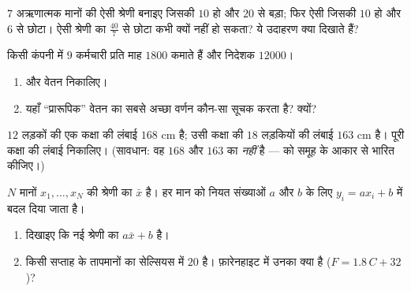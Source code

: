 \begin{exercise}[$\star\star$]\label{exo:g10:stats:6}
$7$ अऋणात्मक मानों की ऐसी श्रेणी बनाइए जिसकी  $10$ हो और 
$20$ से बड़ा; फिर ऐसी जिसकी  $10$ हो और  $6$ से छोटा। ऐसी
श्रेणी का  $\frac{40}{7}$ से छोटा कभी क्यों नहीं हो सकता? ये उदाहरण क्या दिखाते
हैं?
\end{exercise}

\begin{exercise}[$\star\star$]\label{exo:g10:stats:7}
किसी कंपनी में $9$ कर्मचारी प्रति माह $1800$ कमाते हैं और निदेशक $12000$।
\begin{enumerate}
  \item {} और  वेतन निकालिए।
  \item यहाँ ``प्रारूपिक'' वेतन का सबसे अच्छा वर्णन कौन-सा सूचक करता है?
        क्यों?
\end{enumerate}
\end{exercise}

\begin{exercise}[$\star\star$]\label{exo:g10:stats:8}
$12$ लड़कों की एक कक्षा की  लंबाई $168$ cm है; उसी कक्षा की $18$
लड़कियों की  लंबाई $163$ cm है। पूरी कक्षा की  लंबाई निकालिए।
(सावधान: वह $168$ और $163$ का  \emph{नहीं} है ---  को समूह
के आकार से भारित कीजिए।)
\end{exercise}

\begin{exercise}[$\star\star\star$]\label{exo:g10:stats:9}
$N$ मानों $x_1, \dots, x_N$ की श्रेणी का  $\bar x$ है। हर मान को नियत संख्याओं $a$
और $b$ के लिए $y_i = a x_i + b$ में बदल दिया जाता है।
\begin{enumerate}
  \item दिखाइए कि नई श्रेणी का  $a \bar x + b$ है।
  \item किसी सप्ताह के तापमानों का  सेल्सियस में $20$ है। फ़ारेनहाइट
        में उनका  क्या है ($F = 1.8\,C + 32$)?
\end{enumerate}
\end{exercise}


